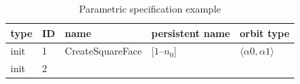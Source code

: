 \begin{table}[t]
\caption{\label{tbl:param-spec}Parametric specification example}
\centering
\begin{tabular}{|l|l|l|l|l|}
\hline
type & ID & name & persistent name & orbit type\\[0pt]
\hline
init & 1 & CreateSquareFace & [\(1 – n_{0}\)] & \(\langle \alpha 0, \alpha 1 \rangle\)\\[0pt]
init & 2 &  &  & \\[0pt]
\hline
\end{tabular}
\end{table}
